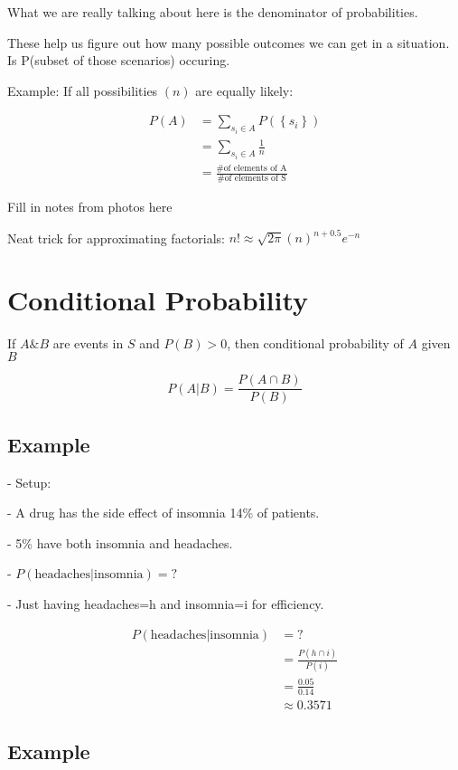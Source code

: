 \documentclass[a4paper]{article}
\begin{document}
What we are really talking about here is the denominator of probabilities.

These help us figure out how many possible outcomes we can get in a situation. Is P(subset of those scenarios) occuring. 

Example: If all possibilities $(n)$ are equally likely:

\begin{align*}	
	P(A) &= \sum_{s_i \in A} P(\left\{ s_i \right\}) \\
	&= \sum_{s_i \in A} \frac{1}{n} \\
	&= \frac{\text{\# of elements of A}}{\text{\# of elements of S}}
\end{align*}

Fill in notes from photos here

Neat trick for approximating factorials: $n! \approx \sqrt{2\pi} (n)^{n+0.5}e^{-n}$

\section*{Conditional Probability}

\begin{definition}[1.3.2]
	If $A \& B$ are events in $S$ and $P(B) > 0$, then conditional probability of $A$ given $B$

	\[P(A|B) = \frac{P(A\cap B)}{P(B)}\]
\end{definition}

\subsection{Example}

- Setup:

- A drug has the side effect of insomnia 14\% of patients. 

- 5\% have both insomnia and headaches.

- $P(\text{headaches}|\text{insomnia}) = ?$

- Just having headaches=h and insomnia=i for efficiency.

\begin{align*}
	P(\text{headaches}|\text{insomnia}) &= ? \\
	&= \frac{P(h \cap i)}{P(i)} \\
	&= \frac{0.05}{0.14} \\
	&\approx 0.3571
\end{align*}

\subsection{Example}
\end{document}
